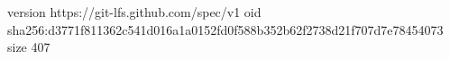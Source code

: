 version https://git-lfs.github.com/spec/v1
oid sha256:d3771f811362c541d016a1a0152fd0f588b352b62f2738d21f707d7e78454073
size 407
